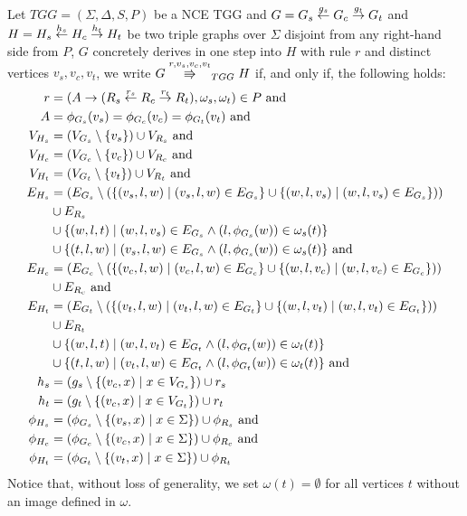 \documentclass[]{report}
\begin{document}
\begin{definition}
	\label{def:tgg_dstep}
	Let $TGG = (\Sigma, \Delta, S, P)$ be a NCE TGG and $G = G_s \overset{g_s}{\leftarrow} G_c \overset{g_t}{\rightarrow} G_t$ and $H = H_s \overset{h_s}{\leftarrow} H_c \overset{h_t}{\rightarrow} H_t$ be two triple graphs over $\Sigma$ disjoint from any right-hand side from $P$, $G$ concretely derives in one step into $H$ with rule $r$ and distinct vertices $v_s, v_c, v_t$, we write $G \tcderiv{r}{v_s,v_c,v_t}{TGG} H$ if, and only if, the following holds:
	\begin{align*}
		r & = (A \to (R_s \overset{r_s}{\leftarrow} R_c \overset{r_t}{\rightarrow} R_t), \omega_s, \omega_t) \in P \text{ and } \\
		A & = \phi_{G_s}(v_s) = \phi_{G_c}(v_c) = \phi_{G_t}(v_t) \text{ and}\\
		V_{H_s}  & = (V_{G_s} \setminus \{v_s\}) \cup V_{R_s} \text{ and}\\
		V_{H_c}  & = (V_{G_c} \setminus \{v_c\}) \cup V_{R_c} \text{ and}\\
		V_{H_t}  & = (V_{G_t} \setminus \{v_t\}) \cup V_{R_t} \text{ and}\\
		E_{H_s} & = (E_{G_s} \setminus (\{(v_s,l,w) \; | \; (v_s,l,w) \in E_{G_s}\} \cup \{(w,l,v_s) \; | \; (w,l,v_s) \in E_{G_s}\})) \\
		& \cup E_{R_s} \\
		& \cup \{(w,l,t) \; | \; (w,l,v_s) \in E_{G_s} \land (l,\phi_{G_s}(w)) \in \omega_{s}(t)\} \\
		& \cup \{(t,l,w) \; | \; (v_s,l,w) \in E_{G_s} \land (l,\phi_{G_s}(w)) \in \omega_{s}(t)\} \text{ and} \\
		E_{H_c} & = (E_{G_c} \setminus (\{(v_c,l,w) \; | \; (v_c,l,w) \in E_{G_c}\} \cup \{(w,l,v_c) \; | \; (w,l,v_c) \in E_{G_c}\})) \\
		& \cup E_{R_c} \text{ and} \\
		E_{H_t} & = (E_{G_t} \setminus (\{(v_t,l,w) \; | \; (v_t,l,w) \in E_{G_t}\} \cup \{(w,l,v_t) \; | \; (w,l,v_t) \in E_{G_t}\})) \\
		& \cup E_{R_t} \\
		& \cup \{(w,l,t) \; | \; (w,l,v_t) \in E_{G_t} \land (l,\phi_{G_t}(w)) \in \omega_{t}(t)\} \\
		& \cup \{(t,l,w) \; | \; (v_t,l,w) \in E_{G_t} \land (l,\phi_{G_t}(w)) \in \omega_{t}(t)\} \text{ and} \\
		h_s		& = (g_s \setminus \{(v_c,x) \; | \; x \in V_{G_s}\}) \cup r_s  \\
		h_t		& = (g_t \setminus \{(v_c,x) \; | \; x \in V_{G_t}\}) \cup r_t  \\
		\phi_{H_s} & = (\phi_{G_s} \setminus \{(v_s,x) \; | \; x \in \Sigma\}) \cup \phi_{R_s} \text{ and}\\
		\phi_{H_c} & = (\phi_{G_c} \setminus \{(v_c,x) \; | \; x \in \Sigma\}) \cup \phi_{R_c} \text{ and}\\
		\phi_{H_t} & = (\phi_{G_t} \setminus \{(v_t,x) \; | \; x \in \Sigma\}) \cup \phi_{R_t}\\
	\end{align*}
	Notice that, without loss of generality, we set $\omega(t) = \emptyset$ for all vertices $t$ without an image defined in $\omega$.
	

\end{definition}
\end{document}
